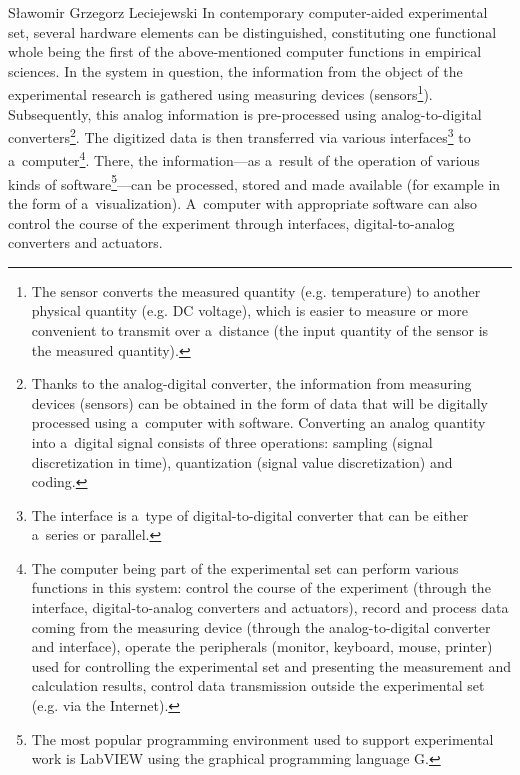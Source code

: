 \begin{artengenv}{Sławomir Grzegorz Leciejewski}
In contemporary computer-aided experimental set, several hardware elements can be distinguished, constituting one functional whole being the first of the above-mentioned computer functions in empirical sciences. In the system in question, the information from the object of the experimental research is gathered using measuring devices (sensors\footnote{The sensor converts the measured quantity (e.g. temperature) to another physical quantity (e.g. DC voltage), which is easier to measure or more convenient to transmit over a~distance (the input quantity of the sensor is the measured quantity).}). Subsequently, this analog information is pre-processed using analog-to-digital converters\footnote{Thanks to the analog-digital converter, the information from measuring devices (sensors) can be obtained in the form of data that will be digitally processed using a~computer with software. Converting an analog quantity into a~digital signal consists of three operations: sampling (signal discretization in time), quantization (signal value discretization) and coding.}. The digitized data is then transferred via various interfaces\footnote{The interface is a~type of digital-to-digital converter that can be either a~series or parallel.} to a~computer\footnote{The computer being part of the experimental set can perform various functions in this system: control the course of the experiment (through the interface, digital-to-analog converters and actuators), record and process data coming from the measuring device (through the analog-to-digital converter and interface), operate the peripherals (monitor, keyboard, mouse, printer) used for controlling the experimental set and presenting the measurement and calculation results, control data transmission outside the experimental set (e.g. via the Internet). }. There, the information---as a~result of the operation of various kinds of software\footnote{The most popular programming environment used to support experimental work is LabVIEW using the graphical programming language G.}---can be processed, stored and made available (for example in the form of a~visualization). A~computer with appropriate software can also control the course of the experiment through interfaces, digital-to-analog converters and actuators.




\end{artengenv}
